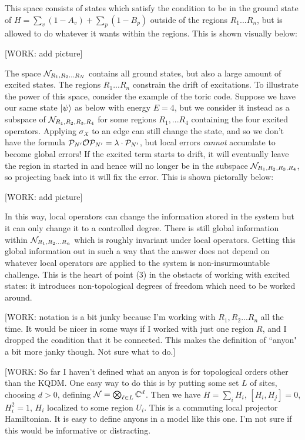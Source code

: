 This space consists of states which satisfy the condition to be in the ground state of $H=\sum_{v}(1-A_v)+\sum_p(1-B_p)$ outside of the regions  $R_1...R_n$, but is allowed to do whatever it wants within the regions. This is shown visually below:

[WORK: add picture]

The space $\mathcal{N}_{R_1,R_2... R_N}$ contains all ground states, but also a large amount of excited states. The regions $R_1... R_n$ constrain the drift of excitations. To illustrate the power of this space, consider the example of the toric code. Suppose we have our same state $\ket{\psi}$ as below with energy $E=4$, but we consider it instead as a subspace of $\mathcal{N}_{R_1,R_2,R_3,R_4}$ for some regions $R_1,...R_4$ containing the four excited operators. Applying $\sigma_X$ to an edge can still change the state, and so we don't have the formula $\mathcal{P}_{N'}\mathcal{O} \mathcal{P}_{N'}=\lambda\cdot \mathcal{P}_{N'}$, but local errors \textit{cannot} accumlate to become global errors! If the excited term starts to drift, it will eventually leave the region in started in and hence will no longer be in the subspace $\mathcal{N}_{R_1,R_2,R_3,R_4}$, so projecting back into it will fix the error. This is shown pictorally below:

[WORK: add picture]

In this way, local operators can change the information stored in the system but it can only change it to a controlled degree. There is still global information within $\mathcal{N}_{R_1,R_2... R_n}$ which is roughly invariant under local operators. Getting this global information out in such a way that the answer does not depend on whatever local operators are applied to the system is non-insurmountable challenge. This is the heart of point (3) in the obstacts of working with excited states: it introduces non-topological degrees of freedom which need to be worked around.

[WORK: notation is a bit junky because I'm working with $R_1,R_2... R_n$ all the time. It would be nicer in some ways if I worked with just one region $R$, and I dropped the condition that it be connected. This makes the definition of ``anyon" a bit more janky though. Not sure what to do.]

[WORK: So far I haven't defined what an anyon is for topological orders other than the KQDM. One easy way to do this is by putting some set $L$ of sites, choosing $d>0$, defining $\mathcal{N}=\bigotimes_{\ell \in L}\mathbb{C}^d$. Then we have $H=\sum_{i}H_i$, $[H_i,H_j]=0$, $H_i^2=1$, $H_i$ localized to some region $U_i$. This is a commuting local projector Hamiltonian. It is easy to define anyons in a model like this one. I'm not sure if this would be informative or distracting.

